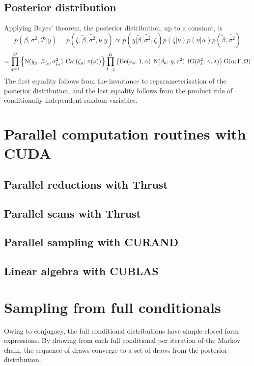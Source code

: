 \subsection{Posterior distribution}
Applying Bayes' theorem, the posterior distribution, up to a constant, is
\begin{equation*}
p(\beta,\sigma^2,\mathcal{P}|y) = p(\zeta, \tilde{\beta},\tilde{\sigma^2},\nu | y) \propto p(y|\tilde{\beta},\tilde{\sigma^2},\zeta) p(\zeta|\nu) p(\nu|\alpha)p(\tilde{\beta},\tilde{\sigma^2})
\end{equation*}
\begin{equation*}
= \prod_{g=1}^G \left\{ \operatorname{N}(y_g;\,\beta_{\zeta_g},\sigma^2_{\zeta_g})\; \operatorname{Cat}(\zeta_g;\, \pi(\nu)) \right\} \prod_{k=1}^K \left\{ \operatorname{Be}(\nu_k;\, 1, \alpha)\; \operatorname{N}(\tilde{\beta_k};\,\eta, \tau^2)\;\operatorname{IG}(\tilde{\sigma}^2_k;\,\gamma,\lambda)\right\} \operatorname{G}(\alpha;\Gamma,\Omega) 
\end{equation*}
The first equality follows from the  invariance to reparameterization of the posterior distribution, and the last equality follows from the product rule of conditionally independent random variables.

\section{Parallel computation routines with CUDA}
\subsection{Parallel reductions with Thrust}
\subsection{Parallel scans with Thrust}
\subsection{Parallel sampling with CURAND}
\subsection{Linear algebra with CUBLAS}

\section{Sampling from full conditionals}
Owing to conjugacy, the full conditional distributions have simple closed form expressions. By drawing from each full conditional per iteration of the Markov chain, the sequence of draws converge to a set of draws from the posterior distribution.


